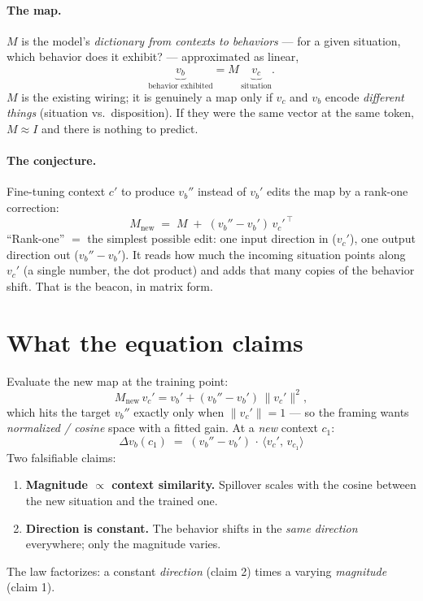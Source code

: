 \documentclass[11pt]{article}
\newcommand{\ip}[2]{\langle #1,\, #2\rangle}
\begin{document}
\paragraph{The map.} $M$ is the model's \emph{dictionary from contexts to behaviors} ---
for a given situation, which behavior does it exhibit? --- approximated as linear,
\[
  \underbrace{v_b}_{\text{behavior exhibited}} = M\,\underbrace{v_c}_{\text{situation}} .
\]
$M$ is the existing wiring; it is genuinely a map only if $v_c$ and $v_b$ encode
\emph{different things} (situation vs.\ disposition). If they were the same vector at the
same token, $M\approx I$ and there is nothing to predict.

\paragraph{The conjecture.} Fine-tuning context $c'$ to produce $v_b''$ instead of $v_b'$
edits the map by a rank-one correction:
\[
  \boxed{\;M_{\text{new}} \;=\; M \;+\; (v_b'' - v_b')\,v_c'^{\,\top}\;}
\]
``Rank-one'' $=$ the simplest possible edit: one input direction in ($v_c'$), one output
direction out ($v_b''-v_b'$). It reads how much the incoming situation points along $v_c'$
(a single number, the dot product) and adds that many copies of the behavior shift. That
is the beacon, in matrix form.

\section*{What the equation claims}

Evaluate the new map at the training point:
\[
  M_{\text{new}}\,v_c'
  = v_b' + (v_b''-v_b')\,\|v_c'\|^2 ,
\]
which hits the target $v_b''$ exactly only when $\|v_c'\|=1$ --- so the framing wants
\emph{normalized / cosine} space with a fitted gain. At a \emph{new} context $c_1$:
\[
  \boxed{\;\Delta v_b(c_1) \;=\; (v_b''-v_b')\,\cdot\,\ip{v_c'}{v_{c_1}}\;}
\]
Two falsifiable claims:
\begin{enumerate}[leftmargin=1.4em]
  \item \textbf{Magnitude $\propto$ context similarity.} Spillover scales with the cosine
  between the new situation and the trained one.
  \item \textbf{Direction is constant.} The behavior shifts in the \emph{same direction}
  everywhere; only the magnitude varies.
\end{enumerate}
The law factorizes: a constant \emph{direction} (claim 2) times a varying
\emph{magnitude} (claim 1).
\end{document}
